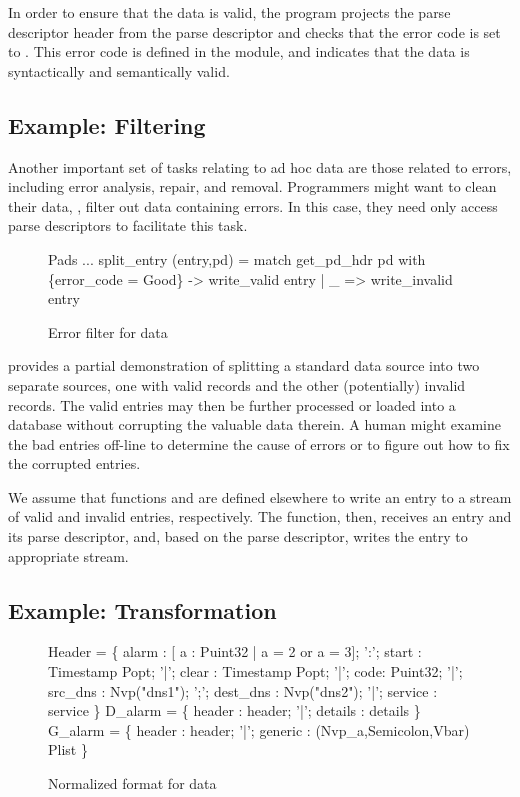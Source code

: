 In order to ensure that the data is valid, the program projects the
parse descriptor header from the parse descriptor  and checks
that the error code is set to .  This error code is defined
in the  module, and indicates that the data is syntactically
and semantically valid.

\subsection{Example: Filtering}
\label{sec:ex-filter}

Another important set of tasks relating to ad hoc data are those
related to errors, including error analysis, repair, and removal.
Programmers might want to clean their data, \ie{}, filter out data
containing errors. In this case, they need only access parse
descriptors to facilitate this task.

\begin{figure}
\begin{code}\scriptsize
{} Pads
   ...
 split_entry (entry,pd) =
   match get\_pd\_hdr pd with
     \{error_code = Good\} -> write_valid entry
   | _ => write_invalid entry\end{code}
\caption{Error filter for \dibbler{} data}
\label{fig:ex-data-clean}
\end{figure}

 provides a partial demonstration of
splitting a standard data source into two separate sources, one with
valid records and the other (potentially) invalid records.  The valid
entries may then be further processed or loaded into a database
without corrupting the valuable data therein.  A human might examine
the bad entries off-line to determine the cause of errors or to figure
out how to fix the corrupted entries.

We assume that functions  and  are
defined elsewhere to write an entry to a stream of valid and invalid
entries, respectively. The  function, then, receives
an entry and its parse descriptor, and, based on the parse descriptor,
writes the entry to appropriate stream.

\subsection{Example: Transformation}
\label{sec:ex-trans}

\begin{figure}
  \centering
  \begin{code}\scriptsize
{} Header = \{
       alarm : [ a : Puint32 | a = 2 or a = 3];
 ':';  start :  Timestamp Popt;
 '|';  clear :  Timestamp Popt;
 '|';  code: Puint32;
 '|';  src\_dns  :  Nvp("dns1");
 ';';  dest\_dns :  Nvp("dns2");
 '|';  service  : service
\}
\mbox{}
 D\_alarm = \{
       header   : header;
 '|';  details  : details
 \}
\mbox{}
 G\_alarm = \{
       header   : header;
 '|';  generic  : (Nvp\_a,Semicolon,Vbar) Plist
\}\end{code}
\caption{Normalized format for \darkstar{} data}
\label{fig:normal-darkstar}
\end{figure}

